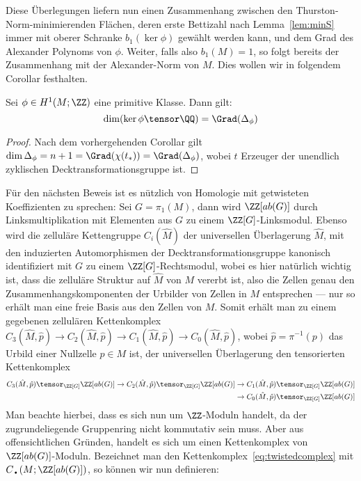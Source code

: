 Diese Überlegungen liefern nun einen Zusammenhang zwischen den Thurston-Norm-minimierenden Flächen, deren erste Bettizahl nach Lemma~\ref{lem:minS} immer mit oberer Schranke $b_1(\ker\phi)$ gewählt werden kann, und dem Grad des Alexander Polynoms von $\phi$. Weiter, falls also $b_1(M)=1$, so folgt bereits der Zusammenhang mit der Alexander-Norm von $M$. Dies wollen wir in folgendem Corollar festhalten.
\begin{cor}
\label{cor:degreealex}
	Sei $\phi \in H^1(M;\ZZ)$ eine primitive Klasse. Dann gilt:
	\[
		\dim(\ker\phi \tensor \QQ) = \Grad(\Delta_\phi) 
	\]
\end{cor}
\begin{proof}
	Nach dem vorhergehenden Corollar gilt $\dim \Delta_\phi = n+1 = \Grad(\chi(t_*)) = \Grad(\Delta_\phi)$, wobei $t$ Erzeuger der unendlich zyklischen Decktransformationsgruppe ist. 
\end{proof}

	Für den nächsten Beweis ist es nützlich von Homologie mit getwisteten Koeffizienten zu sprechen: Sei $G=\pi_1(M)$, dann wird $\ZZ[ab(G)]$ durch Linksmultiplikation mit Elementen aus $G$ zu einem $\ZZ[G]$-Linksmodul. Ebenso wird die zelluläre Kettengruppe $C_i(\hat M)$ der universellen Überlagerung $\hat M$, mit den induzierten Automorphismen der Decktransformationsgruppe kanonisch identifiziert mit $G$ zu einem $\ZZ[G]$-Rechtsmodul, wobei es hier natürlich wichtig ist, dass die zelluläre Struktur auf $\hat M$ von $M$ vererbt ist, also die Zellen genau den Zusammenhangskomponenten der Urbilder von Zellen in $M$ entsprechen --- nur so erhält man eine freie Basis aus den Zellen von $M$. Somit erhält man zu einem gegebenen zellulären Kettenkomplex $C_3(\hat M,\hat p) \to C_2(\hat M,\hat p) \to C_1(\hat M,\hat p) \to C_0(\hat M,\hat p)$, wobei $\hat p = \pi^{-1}(p)$ das Urbild einer Nullzelle $p\in M$ ist, der universellen Überlagerung den tensorierten Kettenkomplex 
\begin{align}
			C_3(\hat M,\hat p)\tensor_{\ZZ[G]}\ZZ[ab(G)] \to C_2(\hat M,\hat p)\tensor_{\ZZ[G]}\ZZ[ab(G)]& \to C_1(\hat M,\hat p)\tensor_{\ZZ[G]}\ZZ[ab(G)] \label{eq:twistedcomplex}\\
			& \to C_0(\hat M,\hat p)\tensor_{\ZZ[G]}\ZZ[ab(G)]  \notag
	\end{align}	
	Man beachte hierbei, dass es sich nun um $\ZZ$-Moduln handelt, da der zugrundeliegende Gruppenring nicht kommutativ sein muss. Aber aus offensichtlichen Gründen, handelt es sich um einen Kettenkomplex von $\ZZ[ab(G)]$-Moduln. Bezeichnet man den Kettenkomplex~\eqref{eq:twistedcomplex} mit $C_\text{\textbullet}(M;\ZZ[ab(G)])$, so können wir nun definieren:

